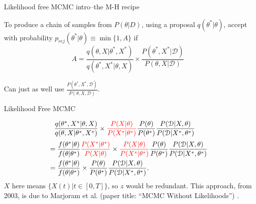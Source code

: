 \documentclass[12pt,a4paper,t,xcolor=dvipsnames,slidestop,compress,mathserif]{beamer}
\newcommand{\red}[1]{{\color{red}#1}}
\begin{document}
\begin{frame}{Likelihood free MCMC intro--the M-H recipe}

To produce a chain of samples from $P(\theta|D)$, using a proposal $q(\theta^*|\theta)$, accept with probability $p_{rej}(\theta^*|\theta)\equiv\min \{1, A\}$ if $$A=\frac{q(\theta,X|\theta^*,X^*)}{q(\theta^*,X^*|\theta,X)} \times \frac{P(\theta^*,X^*|\mathcal{D})}{P(\theta,X|\mathcal{D})}
$$

Can just as well use $\frac{P(\theta^*,X^*,\mathcal{D})}{P(\theta,X,\mathcal{D})}$.

\end{frame}
\begin{frame}{Likelihood Free MCMC}

\begin{align*}
&\frac{q(\theta^*, X^*|\theta, X)}{q(\theta, X|\theta^*, X^*)}
\times 
\red{\frac{P(X| \theta)}{P(X^*| \theta^*)}} 
\frac{ P( \theta)}{ P( \theta^*)} 
\frac{P(\mathcal{D}|X, \theta)}{P(\mathcal{D}|X^*, \theta^*)}
\end{align*}
\pause
\begin{align*}
&=\frac{f(\theta^*|\theta)}{f(\theta|\theta^*)}
\red{\frac{P(X^*| \theta^*)}{P(X| \theta)} }
\times 
\red{\frac{P(X| \theta)}{P(X^*| \theta^*)} } 
\frac{ P( \theta)}{ P( \theta^*)}
\frac{P(\mathcal{D}|X, \theta)}{P(\mathcal{D}|X^*, \theta^*)}\\
&=\frac{f(\theta^*|\theta)}{f(\theta|\theta^*)}
\times 
\frac{ P( \theta)}{ P( \theta^*)} 
\frac{P(\mathcal{D}|X, \theta)}{P(\mathcal{D}|X^*, \theta^*)}.
\end{align*}
\pause
$X$ here means $\{X(t)|t \in [0,T]\}$, so $z$ would be redundant. This approach, from 2003, is due to Marjoram et al. (paper title: ``MCMC Without Likelihoods'') \cite{Marjoram23122003}. 
\end{frame}
\end{document}
